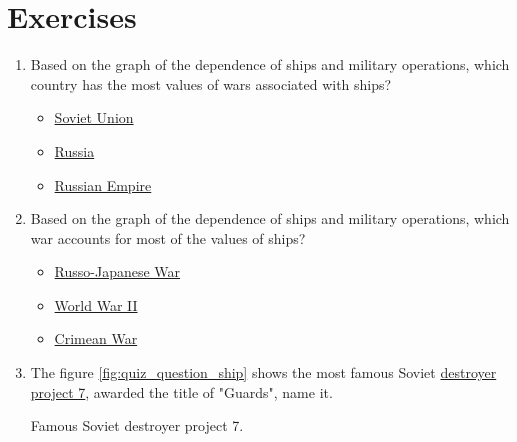 \section{Exercises}

\begin{enumerate}
  \item Based on the graph of the dependence of ships and military operations, which country has the most values of wars associated with ships?
  \begin{itemize}
    \item \href{https://www.wikidata.org/wiki/Q15180}{Soviet Union}
    \item \href{https://www.wikidata.org/wiki/Q159}{Russia}
    \item \href{https://www.wikidata.org/wiki/Q34266}{Russian Empire}
  \end{itemize}
  
  \item Based on the graph of the dependence of ships and military operations, which war accounts for most of the values of ships?
  \begin{itemize}
    \item \href{https://www.wikidata.org/wiki/Q159950}{Russo-Japanese War}
    \item \href{https://www.wikidata.org/wiki/Q362}{World War II}
    \item \href{https://www.wikidata.org/wiki/Q254106}{Crimean War}
  \end{itemize}

  \item The figure \ref{fig:quiz_question_ship} shows the most famous Soviet \href{https://en.wikipedia.org/wiki/Destroyer}{destroyer} \href{https://en.wikipedia.org/wiki/Gnevny-class_destroyer}{project 7}, awarded the title of "Guards", name it.
  \begin{marginfigure}[0.0cm]
    {
      \setlength{\fboxsep}{0pt}%
      \setlength{\fboxrule}{1pt}%
    }
    \caption{Famous Soviet destroyer project 7.}%
    \label{fig:quiz_question_ship}%
  \end{marginfigure}
\end{enumerate}